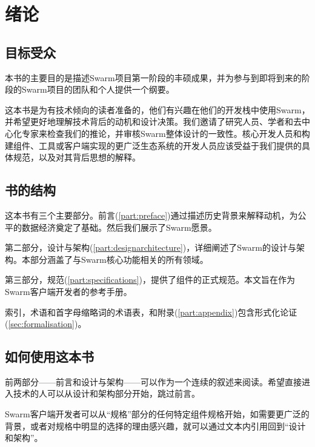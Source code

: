 \chapter{绪论\statusgreen}
\green{}
\section*{目标受众\statusgreen}
本书的主要目的是描述Swarm项目第一阶段的丰硕成果，并为参与到即将到来的阶段的Swarm项目的团队和个人提供一个纲要。

这本书是为有技术倾向的读者准备的，他们有兴趣在他们的开发栈中使用Swarm，并希望更好地理解技术背后的动机和设计决策。我们邀请了研究人员、学者和去中心化专家来检查我们的推论，并审核Swarm整体设计的一致性。核心开发人员和构建组件、工具或客户端实现的更广泛生态系统的开发人员应该受益于我们提供的具体规范，以及对其背后思想的解释。

\section*{书的结构\statusgreen}

这本书有三个主要部分。前言(\ref{part:preface})通过描述历史背景来解释动机，为公平的数据经济奠定了基础。然后我们展示了Swarm愿景。

第二部分，设计与架构(\ref{part:designarchitecture})，详细阐述了Swarm的设计与架构。本部分涵盖了与Swarm核心功能相关的所有领域。

第三部分，规范(\ref{part:specifications})，提供了组件的正式规范。本文旨在作为Swarm客户端开发者的参考手册。

索引，术语和首字母缩略词的术语表，和附录(\ref{part:appendix})包含形式化论证(\ref{sec:formalisation})。

\section*{如何使用这本书\statusgreen}

前两部分——前言和设计与架构——可以作为一个连续的叙述来阅读。希望直接进入技术的人可以从设计和架构部分开始，跳过前言。

Swarm客户端开发者可以从“规格”部分的任何特定组件规格开始，如需要更广泛的背景，或者对规格中明显的选择的理由感兴趣，就可以通过文本内引用回到“设计和架构”。
